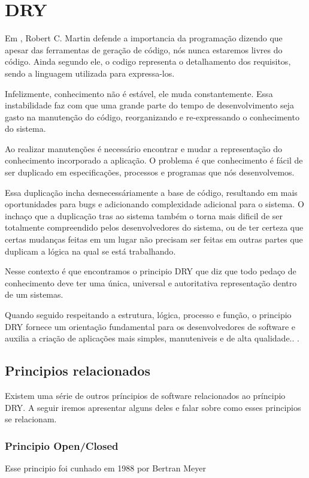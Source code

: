 \chapter{DRY}

Em \cite{clean2009}, Robert C. Martin defende a importancia da programação
dizendo que apesar das ferramentas de geração de código, nós nunca estaremos
livres do código. Ainda segundo ele, o codigo representa o detalhamento dos
requisitos, sendo a linguagem utilizada para expressa-los.

Infelizmente, conhecimento não é estável, ele muda constantemente. Essa
instabilidade faz com que uma grande parte do tempo de desenvolvimento seja
gasto na manutenção do código, reorganizando e re-expressando o conhecimento do
sistema.

Ao realizar manutenções é necessário encontrar e mudar a representação do
conhecimento incorporado a aplicação. O problema é que conhecimento é fácil de
ser duplicado em especificações, processos e programas que nós
desenvolvemos\cite{pragmatic1999}.

Essa duplicação incha desnecessáriamente a base de código, resultando em mais
oportunidades para bugs e adicionando complexidade adicional para o sistema. O
inchaço que a duplicação tras ao sistema também o torna mais dificil de ser
totalmente compreendido pelos desenvolvedores do sistema, ou de ter certeza que
certas mudanças feitas em um lugar não precisam ser feitas em outras partes que
duplicam a lógica na qual se está trabalhando\cite{97things2010}.

Nesse contexto é que encontramos o principio DRY que diz que todo pedaço de
conhecimento deve ter uma única, universal e autoritativa representação dentro
de um sistemas. 

Quando seguido respeitando a estrutura, lógica, processo e função, o principio
DRY fornece um orientação fundamental para os desenvolvedores de software e
auxilia a criação de aplicações mais simples, manuteniveis e de alta qualidade..
\cite{97things2010}.

\section{Principios relacionados}

Existem uma série de outros príncipios de software relacionados ao príncipio
DRY. A seguir iremos apresentar alguns deles e falar sobre como esses principios
se relacionam.

\subsection{Principio Open/Closed}

Esse principio foi cunhado em 1988 por Bertran Meyer\cite{cgems}


